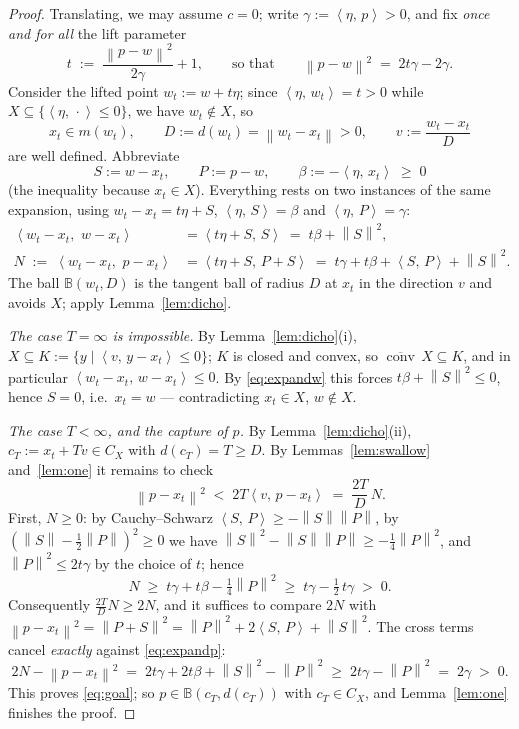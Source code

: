 \documentclass[11pt]{article}
\theoremstyle{remark}
\newcommand{\B}{\mathbb{B}}
\newcommand{\X}{X}
\newcommand{\conv}{\operatorname{conv}}
\newcommand{\cconv}[1]{\overline{\conv}\,#1}
\newcommand{\sca}[2]{\left\langle #1,\, #2\right\rangle}
\newcommand{\norm}[1]{\left\lVert #1\right\rVert}
\newcommand{\Cx}{C_{\X}}
\begin{document}
\begin{proof}
Translating, we may assume $c=0$; write $\gamma:=\sca{\eta}{p}>0$, and fix \emph{once and for
all} the lift parameter
\[
 t\;:=\;\frac{\norm{p-w}^2}{2\gamma}+1,\qquad\text{so that}\qquad
 \norm{p-w}^2\;=\;2t\gamma-2\gamma .
\]
Consider the lifted point $w_t:=w+t\eta$; since $\sca{\eta}{w_t}=t>0$ while
$\X\subseteq\{\sca{\eta}{\cdot}\le0\}$, we have $w_t\notin \X$, so
\[
 x_t\in m(w_t),\qquad D:=d(w_t)=\norm{w_t-x_t}>0,\qquad v:=\frac{w_t-x_t}{D}
\]
are well defined. Abbreviate
\[
 S:=w-x_t,\qquad P:=p-w,\qquad \beta:=-\sca{\eta}{x_t}\;\ge\;0
\]
(the inequality because $x_t\in \X$). Everything rests on two instances of the same expansion,
using $w_t-x_t=t\eta+S$, $\sca{\eta}{S}=\beta$ and $\sca{\eta}{P}=\gamma$:
\begin{align}
 \sca{w_t-x_t}{\,w-x_t}&=\sca{t\eta+S}{S}\;=\;t\beta+\norm S^2,\label{eq:expandw}\\
 N\;:=\;\sca{w_t-x_t}{\,p-x_t}&=\sca{t\eta+S}{P+S}\;=\;t\gamma+t\beta+\sca{S}{P}+\norm S^2 .
 \label{eq:expandp}
\end{align}
The ball $\B(w_t,D)$ is the tangent ball of radius $D$ at $x_t$ in the direction $v$ and avoids
$\X$; apply Lemma~\ref{lem:dicho}.

\emph{The case $T=\infty$ is impossible.} By Lemma~\ref{lem:dicho}(i),
$\X\subseteq K:=\{y\mid\sca{v}{y-x_t}\le0\}$; $K$ is closed and convex, so
$\cconv \X\subseteq K$, and in particular $\sca{w_t-x_t}{w-x_t}\le0$. By \eqref{eq:expandw}
this forces $t\beta+\norm S^2\le0$, hence $S=0$, i.e.\ $x_t=w$ --- contradicting $x_t\in \X$,
$w\notin \X$.

\emph{The case $T<\infty$, and the capture of $p$.} By Lemma~\ref{lem:dicho}(ii),
$c_T:=x_t+Tv\in\Cx$ with $d(c_T)=T\ge D$. By Lemmas~\ref{lem:swallow} and~\ref{lem:one} it
remains to check
\begin{equation}\label{eq:goal}
 \norm{p-x_t}^2\;<\;2T\sca{v}{p-x_t}\;=\;\frac{2T}{D}\,N .
\end{equation}
First, $N\ge0$: by Cauchy--Schwarz $\sca{S}{P}\ge-\norm S\norm P$, by
$(\norm S-\tfrac12\norm P)^2\ge0$ we have $\norm S^2-\norm S\norm P\ge-\tfrac14\norm P^2$, and
$\norm P^2\le 2t\gamma$ by the choice of $t$; hence
\[
 N\;\ge\;t\gamma+t\beta-\tfrac14\norm P^2\;\ge\;t\gamma-\tfrac12\,t\gamma\;>\;0 .
\]
Consequently $\tfrac{2T}{D}N\ge2N$, and it suffices to compare $2N$ with
$\norm{p-x_t}^2=\norm{P+S}^2=\norm P^2+2\sca{S}{P}+\norm S^2$. The cross terms cancel
\emph{exactly} against \eqref{eq:expandp}:
\[
 2N-\norm{p-x_t}^2\;=\;2t\gamma+2t\beta+\norm S^2-\norm P^2
 \;\ge\;2t\gamma-\norm P^2\;=\;2\gamma\;>\;0 .
\]
This proves \eqref{eq:goal}; so $p\in\B(c_T,d(c_T))$ with $c_T\in\Cx$, and Lemma~\ref{lem:one}
finishes the proof.
\end{proof}
\end{document}
